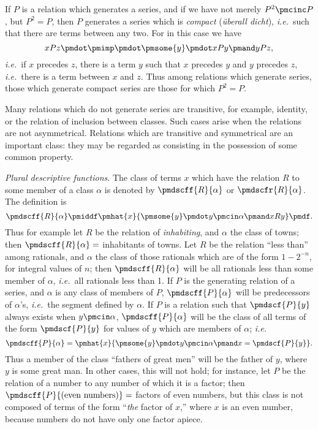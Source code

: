 \documentclass[letterpaper,12pt,openany,leqno]{book}
\newcommand{\pagefirst}[1]{\marginnote[\boxed{\text{#1}}]{\boxed{\text{#1}}}}
\begin{document}
If $P$ is a relation which generates a series, and if we have not merely $P^2 \pmcinc P$, but $P^2 = P$, then $P$ generates a series which is \textit{compact} (\textit{{\"u}berall dicht}), \textit{i.e.}\ such that there are terms between any two. For in this case we have
\[ 
	xPz \pmdot \pmimp \pmdot \pmsome{y}\pmdot xPy \pmand yPz,
\]
\textit{i.e.}\ if $x$ precedes $z$, there is a term $y$ such that $x$ precedes $y$ and $y$ precedes $z$, \textit{i.e.}\ there is a term between $x$ and $z$. Thus among relations which generate series, those which generate compact series are those for which $P^2=P$.

Many relations which do not generate series are transitive, for example, identity, or the relation of inclusion between classes. Such cases arise when the relations are not asymmetrical. Relations which are transitive and symmetrical are an important class: they may be regarded as consisting in the possession of some common property.

\pagefirst{37} \textit{Plural descriptive functions}. The class of terms $x$ which have the relation $R$ to some member of a class $\alpha$ is denoted by $\pmdscff{R}{\alpha}$ or $\pmdscfr{R}{\alpha}$. The definition is
\[
	\pmdscff{R}{\alpha} \pmiddf \pmhat{x}\{\pmsome{y}\pmdot y\pmcin \alpha \pmand xRy\} \pmdf.
\]
Thus for example let $R$ be the relation of \textit{inhabiting}, and $\alpha$ the class of towns; then $\pmdscff{R}{\alpha} = $ inhabitants of towns. Let $R$ be the relation ``less than'' among rationals, and $\alpha$ the class of those rationals which are of the form $1-2^{-n}$, for integral values of $n$; then $\pmdscff{R}{\alpha}$ will be all rationals less than some member of $\alpha$, \textit{i.e.}\ all rationals less than 1. If $P$ is the generating relation of a series, and $\alpha$ is any class of members of $P$, $\pmdscff{P}{\alpha}$ will be predecessors of $\alpha$'s, \textit{i.e.}\ the segment defined by $\alpha$. If $P$ is a relation such that $\pmdscf{P}{y}$ always exists when $y \pmcin \alpha$, $\pmdscff{P}{\alpha}$ will be the class of all terms of the form $\pmdscf{P}{y}$ for values of $y$ which are members of $\alpha$; \textit{i.e.}\
\[
	\pmdscff{P}{\alpha} = \pmhat{x}\{\pmsome{y}\pmdot y \pmcin \alpha \pmand x = \pmdscf{P}{y}\}.
\]
Thus a member of the class ``fathers of great men'' will be the father of $y$, where $y$ is some great man. In other cases, this will not hold; for instance, let $P$ be the relation of a number to any number of which it is a factor; then $\pmdscff{P}{(\text{even numbers})} = $ factors of even numbers, but this class is not composed of terms of the form ``\textit{the} factor of $x$,'' where $x$ is an even number, because numbers do not have only one factor apiece.
\end{document}
